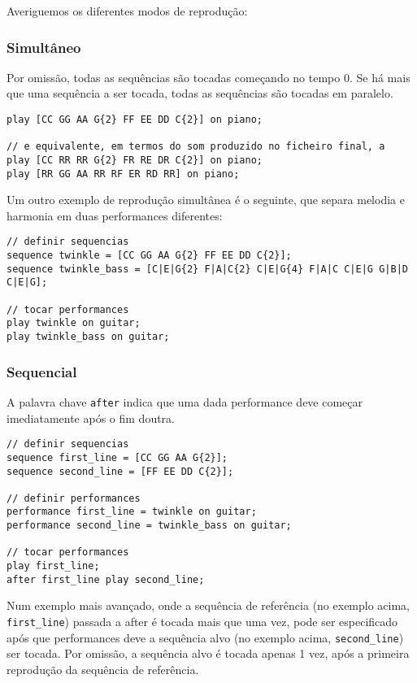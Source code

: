 \documentclass{article}
\begin{document}
Averiguemos os diferentes modos de reprodução:

\subsubsection{Simultâneo}
Por omissão, todas as sequências são tocadas começando no tempo 0. Se há mais que uma sequência a ser tocada, todas as sequências são tocadas em paralelo.

\begin{lstlisting} 
play [CC GG AA G{2} FF EE DD C{2}] on piano;

// e equivalente, em termos do som produzido no ficheiro final, a
play [CC RR RR G{2} FR RE DR C{2}] on piano;
play [RR GG AA RR RF ER RD RR] on piano;
\end{lstlisting}

Um outro exemplo de reprodução simultânea é o seguinte, que separa melodia e harmonia em duas performances diferentes:
\begin{lstlisting} 
// definir sequencias
sequence twinkle = [CC GG AA G{2} FF EE DD C{2}];
sequence twinkle_bass = [C|E|G{2} F|A|C{2} C|E|G{4} F|A|C C|E|G G|B|D C|E|G];

// tocar performances
play twinkle on guitar;
play twinkle_bass on guitar;
\end{lstlisting}

\subsubsection{Sequencial}
A palavra chave \texttt{after} indica que uma dada performance deve começar imediatamente após o fim doutra.
\begin{lstlisting} 
// definir sequencias
sequence first_line = [CC GG AA G{2}];
sequence second_line = [FF EE DD C{2}];

// definir performances
performance first_line = twinkle on guitar;
performance second_line = twinkle_bass on guitar;

// tocar performances
play first_line;
after first_line play second_line;
\end{lstlisting}

Num exemplo mais avançado, onde a sequência de referência (no exemplo acima, \texttt{first\_line}) passada a after é tocada mais que uma vez, pode ser especificado após que performances deve a sequência alvo (no exemplo acima, \texttt{second\_line}) ser tocada. Por omissão, a sequência alvo é tocada apenas 1 vez, após a primeira reprodução da sequência de referência. 
\end{document}
